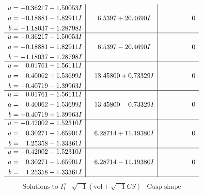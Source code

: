 \documentclass[1p]{elsarticle_modified}
\theoremstyle{definition}
\newcommand{\I}{\sqrt{-1}}
\begin{document}
$$\begin{array}{c|c|c}
\begin{aligned}
u &= -0.36217 + 1.50053 I \\
a &= -0.18881 - 1.82911 I \\
b &= -1.18037 + 1.28798 I\end{aligned}
 & \phantom{-}6.5397 + 20.4690 I & \phantom{-0.000000 } 0 \\ \hline\begin{aligned}
u &= -0.36217 - 1.50053 I \\
a &= -0.18881 + 1.82911 I \\
b &= -1.18037 - 1.28798 I\end{aligned}
 & \phantom{-}6.5397 - 20.4690 I & \phantom{-0.000000 } 0 \\ \hline\begin{aligned}
u &= \phantom{-}0.01761 + 1.56111 I \\
a &= \phantom{-}0.40062 + 1.53699 I \\
b &= -0.40719 - 1.39963 I\end{aligned}
 & \phantom{-}13.45800 + 0.73329 I & \phantom{-0.000000 } 0 \\ \hline\begin{aligned}
u &= \phantom{-}0.01761 - 1.56111 I \\
a &= \phantom{-}0.40062 - 1.53699 I \\
b &= -0.40719 + 1.39963 I\end{aligned}
 & \phantom{-}13.45800 - 0.73329 I & \phantom{-0.000000 } 0 \\ \hline\begin{aligned}
u &= -0.42002 + 1.52310 I \\
a &= \phantom{-}0.30271 + 1.65901 I \\
b &= \phantom{-}1.25358 - 1.33361 I\end{aligned}
 & \phantom{-}6.28714 + 11.19380 I & \phantom{-0.000000 } 0 \\ \hline\begin{aligned}
u &= -0.42002 - 1.52310 I \\
a &= \phantom{-}0.30271 - 1.65901 I \\
b &= \phantom{-}1.25358 + 1.33361 I\end{aligned}
 & \phantom{-}6.28714 - 11.19380 I & \phantom{-0.000000 } 0\\
 \hline 
 \end{array}$$\newpage$$\begin{array}{c|c|c}  
\text{Solutions to }I^u_{1}& \I (\text{vol} + \sqrt{-1}CS) & \text{Cusp shape}\\
 \hline 
\begin{aligned}

\end{aligned}
\end{array}$$
\end{document}
